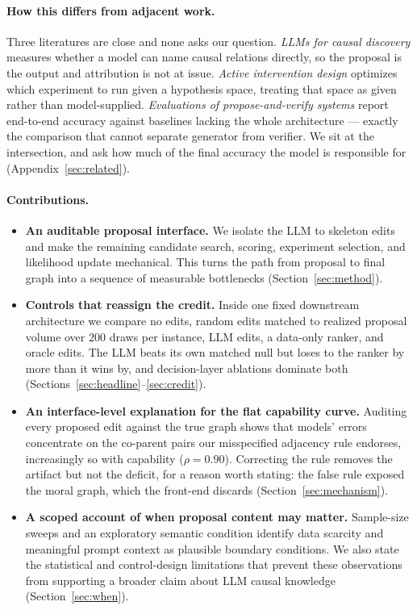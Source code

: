 \documentclass{article}
\begin{document}
\paragraph{How this differs from adjacent work.}
Three literatures are close and none asks our question. \emph{LLMs for causal discovery} measures
whether a model can name causal relations directly, so the proposal is the output and attribution is
not at issue. \emph{Active intervention design} optimizes which experiment to run given a hypothesis
space, treating that space as given rather than model-supplied. \emph{Evaluations of
propose-and-verify systems} report end-to-end accuracy against baselines lacking the whole
architecture --- exactly the comparison that cannot separate generator from verifier. We sit at the
intersection, and ask how much of the final accuracy the model is responsible for
(Appendix~\ref{sec:related}).

\paragraph{Contributions.}
\begin{itemize}\itemsep1pt
\item \textbf{An auditable proposal interface.} We isolate the LLM to skeleton edits and make the
remaining candidate search, scoring, experiment selection, and likelihood update mechanical. This
turns the path from proposal to final graph into a sequence of measurable bottlenecks
(Section~\ref{sec:method}).
\item \textbf{Controls that reassign the credit.} Inside one fixed downstream architecture we
compare no edits, random edits matched to realized proposal volume over $200$ draws per instance,
LLM edits, a data-only ranker, and oracle edits. The LLM beats its own matched null but loses to
the ranker by more than it wins by, and decision-layer ablations dominate both
(Sections~\ref{sec:headline}--\ref{sec:credit}).
\item \textbf{An interface-level explanation for the flat capability curve.} Auditing every
proposed edit against the true graph shows that models' errors concentrate on the co-parent pairs
our misspecified adjacency rule endorses, increasingly so with capability ($\rho=0.90$). Correcting
the rule removes the artifact but not the deficit, for a reason worth stating: the false rule
exposed the moral graph, which the front-end discards (Section~\ref{sec:mechanism}).
\item \textbf{A scoped account of when proposal content may matter.} Sample-size sweeps and an
exploratory semantic condition identify data scarcity and meaningful prompt context as plausible
boundary conditions. We also state the statistical and control-design limitations that prevent
these observations from supporting a broader claim about LLM causal knowledge
(Section~\ref{sec:when}).
\end{itemize}
\end{document}
